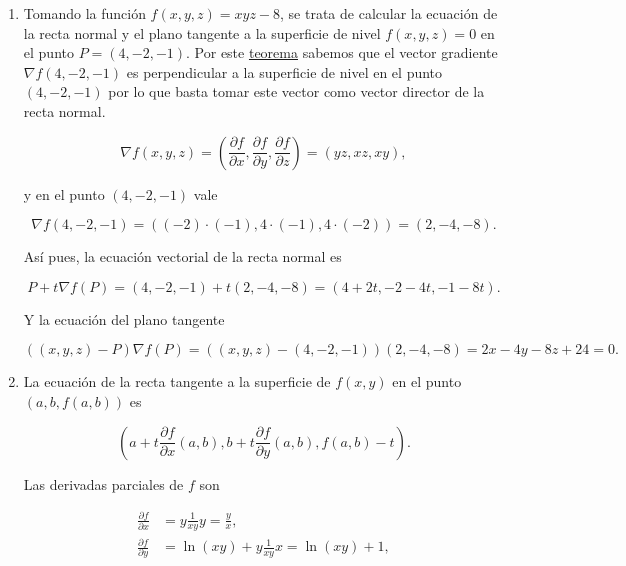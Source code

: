 \documentclass[
  spanish,
  a4paper,
]{scrreport}
\theoremstyle{definition}
\theoremstyle{remark}
\begin{document}
\begin{tcolorbox}[enhanced jigsaw, arc=.35mm, bottomrule=.15mm, bottomtitle=1mm, breakable, colback=white, colbacktitle=quarto-callout-tip-color!10!white, colframe=quarto-callout-tip-color-frame, coltitle=black, left=2mm, leftrule=.75mm, opacityback=0, opacitybacktitle=0.6, rightrule=.15mm, title=\textcolor{quarto-callout-tip-color}{\faLightbulb}\hspace{0.5em}{Solución}, titlerule=0mm, toprule=.15mm, toptitle=1mm]

\begin{enumerate}
\def\labelenumi{\alph{enumi}.}
\item
  Tomando la función \(f(x,y,z)=xyz-8\), se trata de calcular la
  ecuación de la recta normal y el plano tangente a la superficie de
  nivel \(f(x,y,z)=0\) en el punto \(P=(4, -2, -1)\). Por este
  \href{https://aprendeconalf.es/analisis-manual/13-derivadas-funciones-varias-variables.html\#thm-gradiente-normal-curvas-nivel}{teorema}
  sabemos que el vector gradiente \(\nabla f(4,-2,-1)\) es perpendicular
  a la superficie de nivel en el punto \((4,-2,-1)\) por lo que basta
  tomar este vector como vector director de la recta normal.

  \[
   \nabla f(x,y,z) 
   = \left(\frac{\partial f}{\partial x}, \frac{\partial f}{\partial y}, \frac{\partial f}{\partial z}\right)
   = (yz, xz, xy),
   \]

  y en el punto \((4,-2,-1)\) vale

  \[
   \nabla f(4, -2, -1) = ((-2)\cdot (-1), 4\cdot (-1), 4\cdot (-2)) = (2, -4, -8).
   \]

  Así pues, la ecuación vectorial de la recta normal es

  \[
   P + t\nabla f(P) = (4, -2, -1) + t(2, -4, -8) = (4+2t,-2-4t,-1-8t).
   \]

  Y la ecuación del plano tangente

  \[
   ((x,y,z)-P)\nabla f(P) = ((x, y, z) - (4, -2, -1))(2, -4, -8) = 2x-4y-8z+24=0.
   \]
\item
  La ecuación de la recta tangente a la superficie de \(f(x,y)\) en el
  punto \((a, b, f(a,b))\) es

  \[
  \left(a+t\frac{\partial f}{\partial x}(a,b), b + t\frac{\partial f}{\partial y}(a,b), f(a,b)-t\right).
  \]

  Las derivadas parciales de \(f\) son

  \begin{align*}
  \frac{\partial f}{\partial x} 
  &= y\frac{1}{xy}y = \frac{y}{x}, \\
  \frac{\partial f}{\partial y} 
  &= \ln(xy) + y\frac{1}{xy}x = \ln(xy) + 1,
  \end{align*}


\end{enumerate}
\end{tcolorbox}
\end{document}
